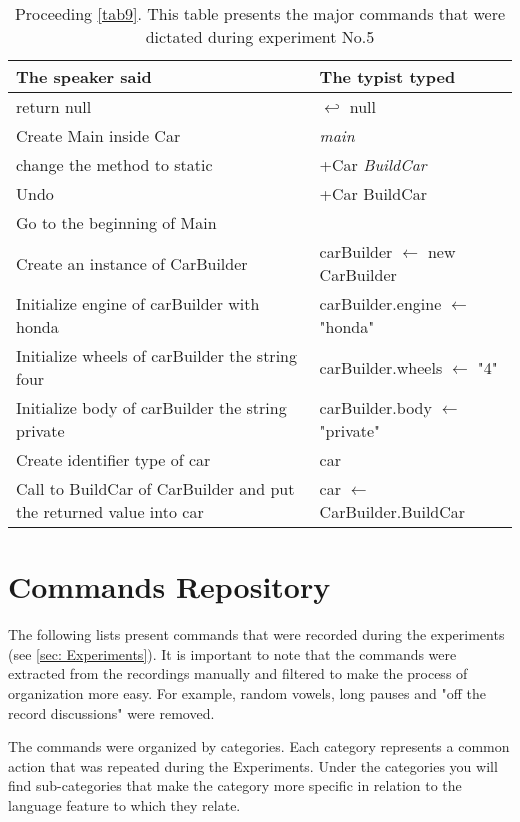 \begin{table}[H]
	\begin{tabular}{|p{10cm}|p{6cm}|}
		\hline
		\rowcolor[HTML]{9B9B9B} 
		{\color[HTML]{000000} The speaker said} & {\color[HTML]{000000} The typist typed} \\ \hline
		return null & $\hookleftarrow$ null \\ \hline
		Create Main inside Car & \textit{main} \\ \hline
		change the method to static & +Car \textit{BuildCar} \\ \hline
		Undo & +Car BuildCar \\ \hline
		Go to the beginning of Main & \\ \hline
		Create an instance of CarBuilder & carBuilder $\leftarrow$ new CarBuilder \\ \hline
		Initialize engine of carBuilder with honda & carBuilder.engine $\leftarrow$ "honda" \\ \hline
		Initialize wheels of carBuilder the string four & carBuilder.wheels $\leftarrow$ "4" \\ \hline
		Initialize body of carBuilder the string private & carBuilder.body $\leftarrow$ "private" \\ \hline
		Create identifier type of car & car \\ \hline
		Call to BuildCar of CarBuilder and put the returned value into car & car $\leftarrow$ CarBuilder.BuildCar \\ \hline
	\end{tabular}
	\caption{Proceeding \autoref{tab9}. This table presents the major commands that were dictated during experiment No.5}
	\label{tab10}
\end{table}
\section{Commands Repository} \label{sec: Commands Repositorysi}
The following lists present commands that were recorded during the experiments (see \ref{sec: Experiments}). It is important to note that the commands were extracted from the recordings manually and filtered to make the process of organization more easy. For example, random vowels, long pauses and "off the record discussions" were removed.

The commands were organized by categories. Each category represents a common action that was repeated during the Experiments. Under the categories you will find sub-categories that make the category more specific in relation to the language feature to which they relate.

